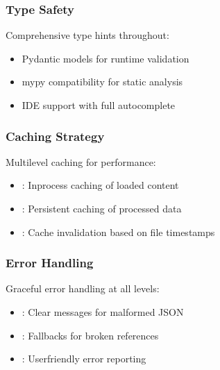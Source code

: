 \documentclass[letterpaper,10pt,english]{sphinxmanual}
\begin{document}
\subsubsection{Type Safety}
\label{\detokenize{developer/architecture:type-safety}}
\sphinxAtStartPar
Comprehensive type hints throughout:
\begin{itemize}
\item {} 
\sphinxAtStartPar
Pydantic models for runtime validation

\item {} 
\sphinxAtStartPar
mypy compatibility for static analysis

\item {} 
\sphinxAtStartPar
IDE support with full autocomplete

\end{itemize}


\subsubsection{Caching Strategy}
\label{\detokenize{developer/architecture:caching-strategy}}
\sphinxAtStartPar
Multi\sphinxhyphen{}level caching for performance:
\begin{itemize}
\item {} 
\sphinxAtStartPar
{}: In\sphinxhyphen{}process caching of loaded content

\item {} 
\sphinxAtStartPar
{}: Persistent caching of processed data

\item {} 
\sphinxAtStartPar
{}: Cache invalidation based on file timestamps

\end{itemize}


\subsubsection{Error Handling}
\label{\detokenize{developer/architecture:error-handling}}
\sphinxAtStartPar
Graceful error handling at all levels:
\begin{itemize}
\item {} 
\sphinxAtStartPar
{}: Clear messages for malformed JSON

\item {} 
\sphinxAtStartPar
{}: Fallbacks for broken references

\item {} 
\sphinxAtStartPar
{}: User\sphinxhyphen{}friendly error reporting

\end{itemize}
\end{document}
